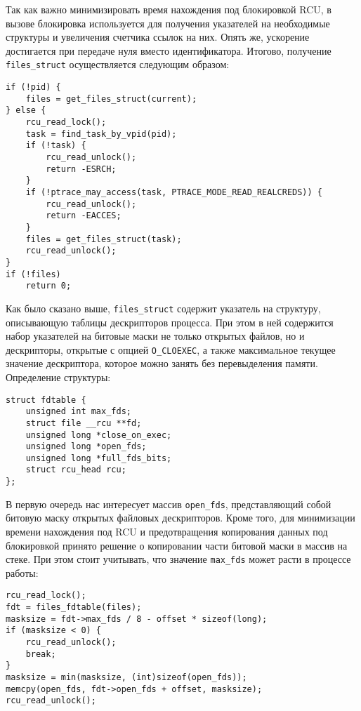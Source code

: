 Так как важно минимизировать время нахождения под блокировкой RCU, в вызове
блокировка используется для получения указателей на необходимые структуры и
увеличения счетчика ссылок на них. Опять же, ускорение достигается при передаче
нуля вместо идентификатора. Итогово, получение \texttt{files\_struct}
осуществляется следующим образом:
\medskip
\begin{lstlisting}[style=cstyle]
if (!pid) {
	files = get_files_struct(current);
} else {
	rcu_read_lock();
	task = find_task_by_vpid(pid);
	if (!task) {
		rcu_read_unlock();
		return -ESRCH;
	}
	if (!ptrace_may_access(task, PTRACE_MODE_READ_REALCREDS)) {
		rcu_read_unlock();
		return -EACCES;
	}
	files = get_files_struct(task);
	rcu_read_unlock();
}
if (!files)
	return 0;
\end{lstlisting}
\medskip

Как было сказано выше, \texttt{files\_struct} содержит указатель на структуру,
описывающую таблицы дескрипторов процесса. При этом в ней содержится набор
указателей на битовые маски не только открытых файлов, но и дескрипторы, открытые
с опцией \texttt{O\_CLOEXEC}, а также максимальное текущее значение дескриптора,
которое можно занять без перевыделения памяти. Определение структуры:
\medskip
\begin{lstlisting}[style=cstyle]
struct fdtable {
	unsigned int max_fds;
	struct file __rcu **fd;
	unsigned long *close_on_exec;
	unsigned long *open_fds;
	unsigned long *full_fds_bits;
	struct rcu_head rcu;
};
\end{lstlisting}
\medskip

В первую очередь нас интересует массив \texttt{open\_fds}, представляющий собой
битовую маску открытых файловых дескрипторов. Кроме того, для минимизации
времени нахождения под RCU и предотвращения копирования данных под блокировкой
принято решение о копировании части битовой маски в массив на стеке. При этом
стоит учитывать, что значение \texttt{max\_fds} может расти в процессе работы:
\medskip
\begin{lstlisting}[style=cstyle]
rcu_read_lock();
fdt = files_fdtable(files);
masksize = fdt->max_fds / 8 - offset * sizeof(long);
if (masksize < 0) {
	rcu_read_unlock();
	break;
}
masksize = min(masksize, (int)sizeof(open_fds));
memcpy(open_fds, fdt->open_fds + offset, masksize);
rcu_read_unlock();
\end{lstlisting}
\medskip

